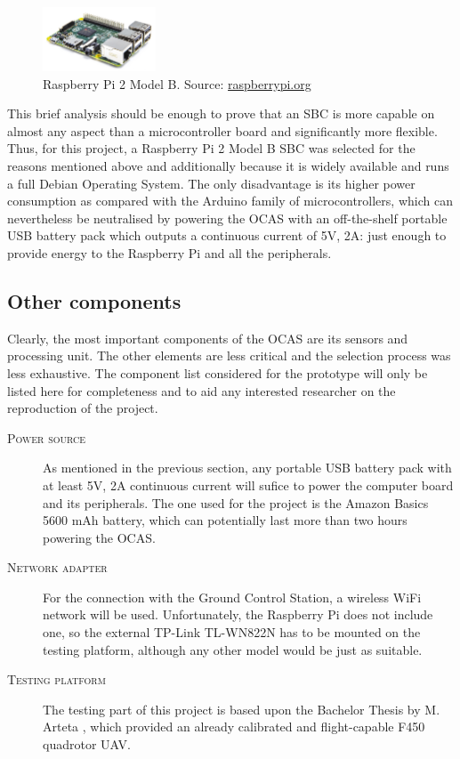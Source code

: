\begin{figure}
	\centering
	\includegraphics[width=0.3\textwidth]{./figures/rpi.jpg}
	\caption{Raspberry Pi 2 Model B. {\footnotesize Source: \url{raspberrypi.org}}}
	\label{fig:rpi}
\end{figure}
This brief analysis should be enough to prove that an SBC is more capable on almost any aspect than a microcontroller board and significantly more flexible.
Thus, for this project, a Raspberry Pi 2 Model B SBC was selected for the reasons mentioned above and additionally because it is widely available and runs a full Debian Operating System.
The only disadvantage is its higher power consumption as compared with the Arduino family of microcontrollers, which can nevertheless be neutralised by powering the OCAS with an off-the-shelf portable USB battery pack which outputs a continuous current of 5V, 2A: just enough to provide energy to the Raspberry Pi and all the peripherals.

\subsection{Other components}

Clearly, the most important components of the OCAS are its sensors and processing unit.
The other elements are less critical and the selection process was less exhaustive.
The component list considered for the prototype will only be listed here for completeness and to aid any interested researcher on the reproduction of the project.

\begin{description}
	\item[\scshape Power source] As mentioned in the previous section, any portable USB battery pack with at least 5V, 2A continuous current will sufice to power the computer board and its peripherals.
		The one used for the project is the Amazon Basics 5600 mAh battery, which can potentially last more than two hours powering the OCAS.
	\item[\scshape Network adapter] For the connection with the Ground Control Station, a wireless WiFi network will be used.
		Unfortunately, the Raspberry Pi does not include one, so the external TP-Link TL-WN822N has to be mounted on the testing platform, although any other model would be just as suitable.
	\item[\scshape Testing platform] The testing part of this project is based upon the Bachelor Thesis by M. Arteta \cite{arteta2015}, which provided an already calibrated and flight-capable F450 quadrotor UAV.
\end{description}



